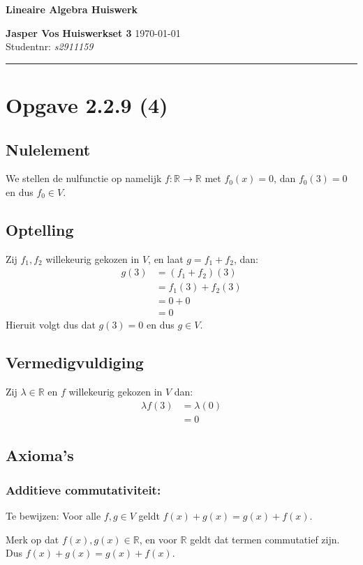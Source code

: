 \documentclass{article}
\newcommand{\R}{\mathbb{R}}
\begin{document}
{\Large \textbf{Lineaire Algebra Huiswerk}}

\bigskip

\textbf{Jasper Vos} \hfill \textbf{Huiswerkset 3} \hfill \today \\
Studentnr: \emph{s2911159}

\rule{\textwidth}{2pt}

\bigskip

\section*{Opgave 2.2.9 (4)}
\subsection*{Nulelement}
We stellen de nulfunctie op namelijk $f: \R \rightarrow \R$ met $f_0(x) = 0$, dan $f_0(3) = 0$ en dus $f_0 \in V$.
\subsection*{Optelling}
Zij $f_1, f_2$ willekeurig gekozen in $V$, en laat $g = f_1 + f_2$, dan:
\begin{align*}
    g(3) & = (f_1 + f_2)(3)  \\
         & = f_1(3) + f_2(3) \\
         & = 0 + 0           \\
         & = \boxed{0}
\end{align*}
Hieruit volgt dus dat $g(3) = 0$ en dus $g \in V$.
\subsection*{Vermedigvuldiging}
Zij $\lambda \in \R$ en $f$ willekeurig gekozen in $V$ dan:
\begin{align*}
    \lambda f(3) & = \lambda (0) \\
                 & = \boxed{0}
\end{align*}
\subsection*{Axioma's}
\subsubsection*{Additieve commutativiteit:}
Te bewijzen: Voor alle $f, g \in V$ geldt $f(x) + g(x) = g(x) + f(x)$.

Merk op dat $f(x), g(x) \in \R$, en voor $\R$ geldt dat termen commutatief zijn.
Dus $f(x) + g(x) = g(x) + f(x)$.
\end{document}
